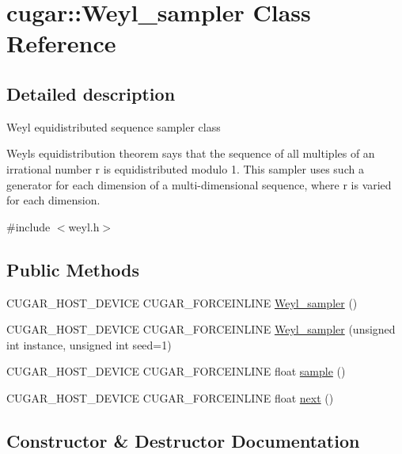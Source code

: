 \hypertarget{classcugar_1_1_weyl__sampler}{}\section{cugar\+:\+:Weyl\+\_\+sampler Class Reference}
\label{classcugar_1_1_weyl__sampler}


\subsection{Detailed description}
Weyl equidistributed sequence sampler class

Weyl\textquotesingle{}s equidistribution theorem says that the sequence of all multiples of an irrational number r is equidistributed modulo 1. This sampler uses such a generator for each dimension of a multi-\/dimensional sequence, where r is varied for each dimension. 

{\ttfamily \#include $<$weyl.\+h$>$}

\subsection*{Public Methods}
\begin{DoxyCompactItemize}
\item 
C\+U\+G\+A\+R\+\_\+\+H\+O\+S\+T\+\_\+\+D\+E\+V\+I\+CE C\+U\+G\+A\+R\+\_\+\+F\+O\+R\+C\+E\+I\+N\+L\+I\+NE \hyperlink{classcugar_1_1_weyl__sampler_a583d3fa23b5cf2366ea222962dc35cae}{Weyl\+\_\+sampler} ()
\item 
C\+U\+G\+A\+R\+\_\+\+H\+O\+S\+T\+\_\+\+D\+E\+V\+I\+CE C\+U\+G\+A\+R\+\_\+\+F\+O\+R\+C\+E\+I\+N\+L\+I\+NE \hyperlink{classcugar_1_1_weyl__sampler_a246414bfc5d0d95cf67efe50839e0a75}{Weyl\+\_\+sampler} (unsigned int instance, unsigned int seed=1)
\item 
C\+U\+G\+A\+R\+\_\+\+H\+O\+S\+T\+\_\+\+D\+E\+V\+I\+CE C\+U\+G\+A\+R\+\_\+\+F\+O\+R\+C\+E\+I\+N\+L\+I\+NE float \hyperlink{classcugar_1_1_weyl__sampler_a0d71d08672aadb68aca1b97f2c1ddda0}{sample} ()
\item 
C\+U\+G\+A\+R\+\_\+\+H\+O\+S\+T\+\_\+\+D\+E\+V\+I\+CE C\+U\+G\+A\+R\+\_\+\+F\+O\+R\+C\+E\+I\+N\+L\+I\+NE float \hyperlink{classcugar_1_1_weyl__sampler_aedcdee9cfb11e41c431e550c485ba035}{next} ()
\end{DoxyCompactItemize}


\subsection{Constructor \& Destructor Documentation}
\mbox{\label{classcugar_1_1_weyl__sampler_a583d3fa23b5cf2366ea222962dc35cae}} 
